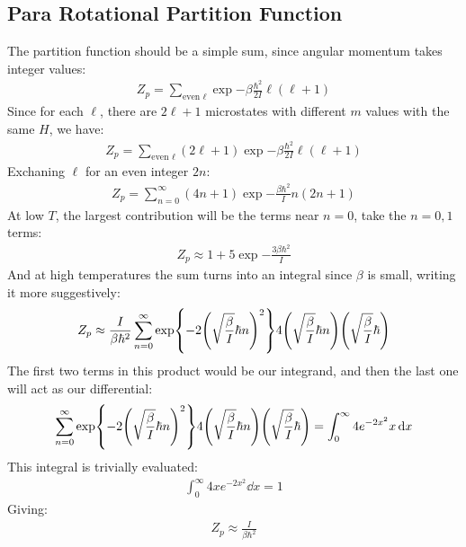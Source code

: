 \documentclass[12pt]{article}
\begin{document}
\subsection{Para Rotational Partition Function}
The partition function should be a simple sum, since angular momentum takes integer values:
\begin{align*}
  Z_p=\sum_{\text{even }\ell}\exp{-\beta\frac{\hbar^2}{2I}\ell(\ell+1)}
\end{align*}
Since for each $\ell$, there are $2\ell+1$ microstates with different $m$ values with the same $H$, we have:
\begin{align*}
  Z_p=\sum_{\text{even }\ell}(2\ell+1)\exp{-\beta\frac{\hbar^2}{2I}\ell(\ell+1)}
\end{align*}
Exchaning $\ell$ for an even integer $2n$:
\begin{align*}
  Z_p=\sum_{n=0}^\infty(4n+1)\exp{-\frac{\beta\hbar^2}{I}n(2n+1)}
\end{align*}
At low $T$, the largest contribution will be the terms near $n=0$, take the $n=0,1$ terms:
\begin{align}
  \boxed{Z_p\approx1+5\exp{-\frac{3\beta\hbar^2}{I}}}
\end{align}
And at high temperatures the sum turns into an integral since $\beta$ is small, writing it more suggestively:
\begin{align*}
  Z_p\approx\frac{I}{\beta\hbar^2}\sum_{n=0}^\infty
  \exp{-2\qty(\sqrt{\frac{\beta}{I}}\hbar n)^2}
  4\qty(\sqrt{\frac{\beta}{I}}\hbar n)
  \qty(\sqrt{\frac{\beta}{I}}\hbar)
\end{align*}
The first two terms in this product would be our integrand, and then the last one will act as our differential:
\begin{align*}
  \sum_{n=0}^\infty\exp{-2\qty(\sqrt{\frac{\beta}{I}}\hbar n)^2}
  4\qty(\sqrt{\frac{\beta}{I}}\hbar n)
  \qty(\sqrt{\frac{\beta}{I}}\hbar)
  =\int_0^\infty 4e^{-2x^2}x\dd{x}
\end{align*}
This integral is trivially evaluated:
\begin{align*}
  \int_0^\infty 4xe^{-2x^2}\dd{x}=1
\end{align*}
Giving:
\begin{align}
  \boxed{Z_p\approx\frac{I}{\beta\hbar^2}}
\end{align}
\end{document}
